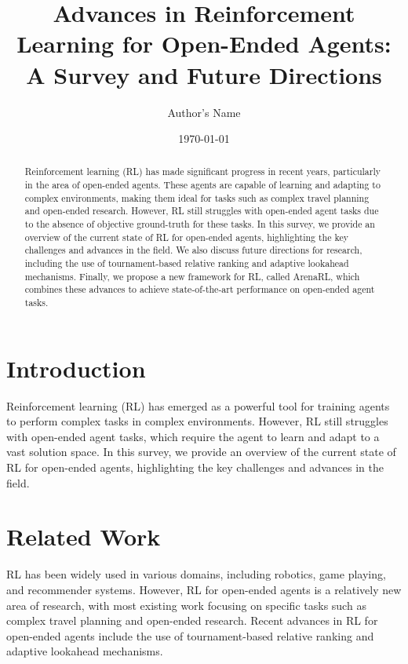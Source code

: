 \documentclass[12pt]{article}
\begin{document}
\title{Advances in Reinforcement Learning for Open-Ended Agents: A Survey and Future Directions}

\author{Author's Name}

\date{\today}

\maketitle

\begin{abstract}
Reinforcement learning (RL) has made significant progress in recent years, particularly in the area of open-ended agents. These agents are capable of learning and adapting to complex environments, making them ideal for tasks such as complex travel planning and open-ended research. However, RL still struggles with open-ended agent tasks due to the absence of objective ground-truth for these tasks. In this survey, we provide an overview of the current state of RL for open-ended agents, highlighting the key challenges and advances in the field. We also discuss future directions for research, including the use of tournament-based relative ranking and adaptive lookahead mechanisms. Finally, we propose a new framework for RL, called ArenaRL, which combines these advances to achieve state-of-the-art performance on open-ended agent tasks.
\end{abstract}

\section{Introduction}

Reinforcement learning (RL) has emerged as a powerful tool for training agents to perform complex tasks in complex environments. However, RL still struggles with open-ended agent tasks, which require the agent to learn and adapt to a vast solution space. In this survey, we provide an overview of the current state of RL for open-ended agents, highlighting the key challenges and advances in the field.

\section{Related Work}

RL has been widely used in various domains, including robotics, game playing, and recommender systems. However, RL for open-ended agents is a relatively new area of research, with most existing work focusing on specific tasks such as complex travel planning and open-ended research. Recent advances in RL for open-ended agents include the use of tournament-based relative ranking and adaptive lookahead mechanisms.
\end{document}
